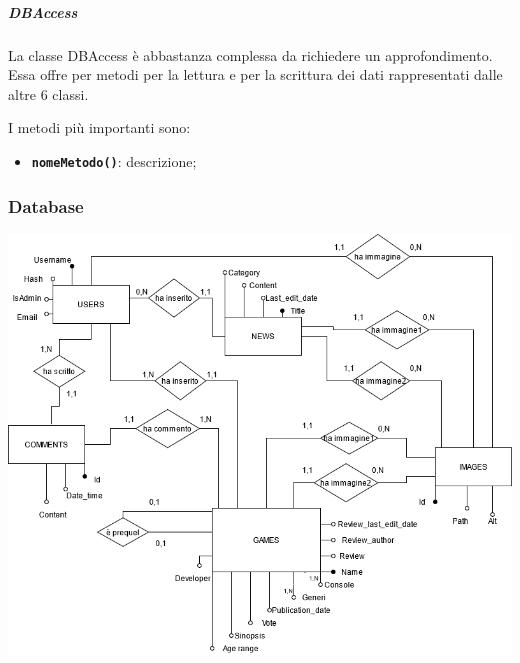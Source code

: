 \subparagraph{DBAccess} 
La classe DBAccess è abbastanza complessa da richiedere un approfondimento.
Essa offre per metodi per la lettura e per la scrittura dei dati rappresentati dalle altre 6 classi.

I metodi più importanti sono:
\begin{itemize}
	\item \textbf{\texttt{nomeMetodo()}}: descrizione;

\end{itemize}

\subsubsection{Database}


  \includegraphics[width=\linewidth]{./img/diagramma_er.png}
  


